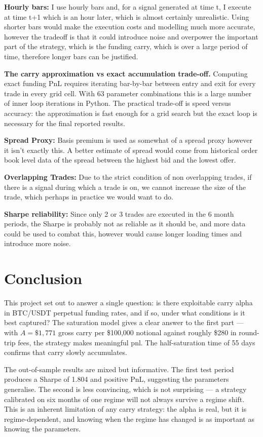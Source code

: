 \documentclass[11pt,a4paper]{article}
\begin{document}
\textbf{Hourly bars:} I use hourly bars and, for a signal generated at time t, I execute at time t+1 which is an hour later, which is almost certainly unrealistic. Using shorter bars would make the execution costs and modelling much more accurate, however the tradeoff is that it could introduce noise and overpower the important part of the strategy, which is the funding carry, which is over a large period of time, therefore longer bars can be justified.

\textbf{The carry approximation vs exact accumulation trade-off.}
Computing exact funding PnL requires iterating bar-by-bar between entry
and exit for every trade in every grid cell. With 63 parameter
combinations this is a large number
of inner loop iterations in Python. The practical trade-off is speed
versus accuracy: the approximation is fast enough for a grid search but
the exact loop is necessary for the final reported results. 

\textbf{Spread Proxy:} Basis premium is used as somewhat of a spread proxy however it isn't exactly this. A better estimate of spread would come from historical order book level data of the spread between the highest bid and the lowest offer.

\textbf{Overlapping Trades:} Due to the strict condition of non overlapping trades, if there is a signal during which a trade is on, we cannot increase the size of the trade, which perhaps in practice we would want to do.

\textbf{Sharpe reliability:} Since only 2 or 3 trades are executed in the 6 month periods, the Sharpe is probably not as reliable as it should be, and more data could be used to combat this, however would cause longer loading times and introduce more noise.

\section*{Conclusion}

This project set out to answer a single question: is there exploitable carry 
alpha in BTC/USDT perpetual funding rates, and if so, under what conditions 
is it best captured? The saturation model gives a clear answer to the first 
part --- with $A = \$1{,}771$ gross carry per \$100{,}000 notional against 
roughly \$280 in round-trip fees, the strategy makes meaningful pnl. The half-saturation time of 55 days confirms that carry slowly accumulates.

The out-of-sample results are mixed but informative. The first test period 
produces a Sharpe of 1.804 and positive PnL, suggesting the parameters 
generalise. The second is less convincing, which is not surprising --- a 
strategy calibrated on six months of one regime will not always survive a 
regime shift. This is an inherent limitation of any carry strategy: the 
alpha is real, but it is regime-dependent, and knowing when the regime has 
changed is as important as knowing the parameters.
\end{document}
